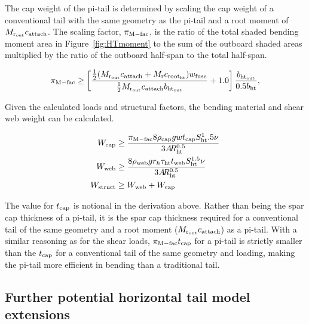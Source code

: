 The cap weight of the pi-tail is determined by scaling the cap weight of a 
conventional tail with the same geometry as the pi-tail and a root moment of 
$M_{\rm{r}_{\rm{out}}} c_{\rm{attach}}$. The scaling factor, $\pi_{\rm{M-fac}}$, is the ratio of the 
total shaded bending moment area in Figure~\ref{fig:HTmoment} to the sum of the 
outboard shaded areas multiplied by the ratio of the outboard half-span to the 
total half-span.

\begin{equation}
    \pi_{\rm{M-fac}} \geq \left[\frac{\frac{1}{2}(M_{\rm{r}_{\rm{out}}} c_{\rm{attach}} +
    M_{\rm{r}} c_{\rm{root}_{\rm{ht}}}) w_{\textrm{fuse}}} {\frac{1}{2}M_{\rm{r}_{\rm{out}}} c_{\rm{attach}} 
b_{\rm{ht}_{\rm{out}}}} + 1.0\right]
    \frac{b_{\rm{ht}_{\rm{out}}}} {0.5b_{\rm{ht}}},
\end{equation}

Given the calculated loads and structural factors, the bending material and 
shear web weight can be calculated. 

\begin{align}
    W_{\rm{cap}} &\geq \frac{\pi_{\rm{M-fac}} 8 \rho_{\rm{cap}} g w t_{\rm{cap}} S_{\rm{ht}}^1.5 \nu}
    {3A\hspace{-2.0pt}R_{\rm{ht}}^{0.5}}\\
    W_{\rm{web}} &\geq \frac{8 \rho_{\rm{web}} g r_h \tau_{\rm{ht}} t_{\rm{web}} S_{\rm{ht}}^{1.5} 
\nu}{3A\hspace{-2.0pt}R_{\rm{ht}}^{0.5}}\\
    W_{\rm{struct}} &\geq W_{\rm{web}} + W_{\rm{cap}}
\end{align}

The value for $t_{\rm{cap}}$ is notional in the derivation above. Rather than being 
the spar cap thickness of a pi-tail, it is the spar cap thickness required for a 
conventional tail of the same geometry and a root moment  ($M_{\rm{r}_{\rm{out}}} 
c_{\rm{attach}}$) as a pi-tail. With a similar reasoning as for the shear loads, 
$\pi_{\rm{M-fac}} t_{\rm{cap}}$ for a pi-tail is strictly smaller than the $t_{\rm{cap}}$ for a 
conventional tail of the same geometry and loading, making the pi-tail more 
efficient in bending than a traditional tail. 

\subsection{Further potential horizontal tail model extensions}
\label{sec:HTExtensions}